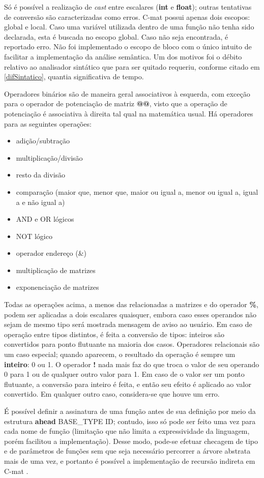 \documentclass[
	article,			%
	11pt,				%
	oneside,			%
	a4paper,			%
	english,			%
	brazil,				%
	sumario=tradicional
	]{abntex2}
\renewcommand{\it}[1]{\textit{#1}}
\renewcommand{\bf}[1]{\textbf{#1}}
\begin{document}
Só é possível a realização de \it{cast} entre escalares (\bf{int} e \bf{float}); outras tentativas de conversão são caracterizadas como erros. C-mat possui apenas dois escopos: global e local. Caso uma variável utilizada dentro de uma função não tenha sido declarada, esta é buscada no escopo global. Caso não seja encontrada, é reportado erro. Não foi implementado o escopo de bloco com o
único intuito de facilitar a implementação da análise semântica. Um dos motivos foi o débito relativo ao analisador sintático que para ser quitado requeriu, conforme citado em \ref{difSintatico}, quantia significativa de tempo.

Operadores binários são de maneira geral associativos à esquerda, com exceção para o operador de potenciação de matriz \bf{@@}, visto que a operação de potenciação é associativa à direita tal qual na matemática usual. Há operadores para as seguintes operações:
\begin{itemize}
	\item adição/subtração
	\item multiplicação/divisão
	\item resto da divisão
	\item comparação (maior que, menor que, maior ou igual a, menor ou igual a, igual a e não igual a)
	\item AND e OR lógicos
	\item NOT lógico
	\item operador endereço (\&)
	\item multiplicação de matrizes
	\item exponenciação de matrizes
\end{itemize}

Todas as operações acima, a menos das relacionadas a matrizes e do operador \bf{\%}, podem ser aplicadas a dois escalares quaisquer, embora caso esses operandos não sejam de mesmo tipo será mostrada mensagem de aviso ao usuário. Em caso de operação entre tipos distintos, é feita a conversão de tipos: inteiros são convertidos para ponto flutuante na maioria dos casos. Operadores relacionais são um caso especial; quando aparecem, o resultado da operação é sempre um \bf{inteiro}: 0 ou 1. O operador \bf{!} nada mais faz do que troca o valor de seu operando 0 para 1 ou de qualquer outro valor para 1. Em caso de o valor ser um ponto flutuante, a conversão para inteiro é feita, e então seu efeito é aplicado ao valor convertido. Em qualquer outro caso, considera-se que houve um erro.

É possível definir a assinatura de uma função antes de sua definição por meio da estrutura \bf{ahead} BASE\_TYPE ID; contudo, isso só pode ser feito uma vez para cada nome de função (limitação que não limita a expressividade da linguagem, porém facilitou a implementação). Desse modo, pode-se efetuar checagem de tipo e de parâmetros de funções sem que seja necessário percorrer a árvore abstrata mais de uma vez, e portanto é possível a implementação de recursão indireta em C-mat .
\end{document}
